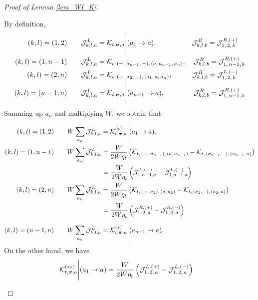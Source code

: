 \documentclass[10pt,reqno]{article}
\theoremstyle{plain} %
\theoremstyle{remark}
\numberwithin{equation}{section}
\begin{document}
\begin{proof}[Proof of Lemma \ref{lem_WI_K}]
\begin{itemize}
By definition,  
\begin{align} 
 (k,l)=(1,2) \quad &\quad   {\cal J}^L_{k,l,a}  ={\cal K}_{t, \boldsymbol{\sigma}, \textbf{a}}\Bigg|(a_1\to a) ,  
 &{\cal J}^R_{k,l,b}=  {\cal J}^{R,(+)}_{1,\,2,\,b}\quad 
 \\\nonumber
 (k,l)=(1,n-1)\quad &\quad {\cal J}^L_{k,l,a}  =
 {\cal K}_{t, \,(+,\;\sigma_{n-1},\,-),\, (a,\,a_{n-1},\,a_n)},  
 &{\cal J}^R_{k,l,b}=  {\cal J}^{R,(+)}_{1,\,{n-1},\,b}
  \\\nonumber
 (k,l)=(2,n)  \quad &\quad  {\cal J}^L_{k,l,a}  =
 {\cal K}_{t, \,(+,\;\sigma_{2},\,-),\, (a_1,\,a,\,a_n)} ,  
 &{\cal J}^R_{k,l,b}=  {\cal J}^{L,(-)}_{1,\,2,\,b}\quad 
 \\\nonumber
 (k,l)=(n-1,n)\quad &\quad {\cal J}^L_{k,l,a}  ={\cal K}_{t, \boldsymbol{\sigma}, \textbf{a}}\Bigg|(a_{n-1}\to a), 
 &{\cal J}^R_{k,l,b}=  {\cal J}^{R,(+)}_{1,\,{n-1},\,b}
\end{align}
 Summing  up $a_n$ and multiplying  $W$,  we obtain that
 \begin{align} 
 (k,l)=(1,2) \quad &\quad  W\sum_{a_n} {\cal J}^L_{k,l,a}  ={\cal K}^{(*)}_{t, \boldsymbol{\sigma}, \textbf{a}}\Bigg|(a_1\to a) ,  
   \\\nonumber
 (k,l)=(1,n-1)\quad &\quad W \sum_{a_n}{\cal J}^L_{k,l,a}  =
 \frac{W}{2W\eta_t} 
 \left({\cal K}_{t, \,(+,\;\sigma_{n-1}),\, (a,\,a_{n-1} )} 
 - {\cal K}_{t, \,( \sigma_{n-1},-),\, ( a_{n-1}, \, a )}  \right)
 \\\nonumber
 & \quad \quad \quad\quad \quad \quad\;=  \frac{W}{2W\eta_t} 
 \left({\cal J}^{L, (+)}_{1,n-1,a} 
 - {\cal J}^{L, (-)}_{1,n-1,a} \right)
   \\\nonumber
 (k,l)=(2,n)  \quad &\quad  W\sum_{a_n} {\cal J}^L_{k,l,a}  =
\frac{W}{2W\eta_t} 
 \left({\cal K}_{t, \,(+,\;\sigma_{2}),\, (a,\,a_{2} )} 
 - {\cal K}_{t, \,( \sigma_{2},-),\, ( a_{2}, \, a )}  \right)
 \\\nonumber
 & \quad \quad \quad\quad \quad \quad\;=  \frac{W}{2W\eta_t} 
 \left({\cal J}^{R, (+)}_{1,\,2,\,a} 
 - {\cal J}^{R, (-)}_{1,\,2,\,a} \right)  \\\nonumber
 (k,l)=(n-1,n)\quad &\quad  W\sum_{a_n}{\cal J}^L_{k,l,a}  ={\cal K}^{(*)}_{t, \boldsymbol{\sigma}, \textbf{a}}\Bigg|(a_{n-1}\to a), 
 \end{align}
  On the other hand, we have 
  \begin{align}
      {\cal K}^{(**)}_{t, \boldsymbol{\sigma}, \textbf{a}}\Bigg|(a_1\to a) 
      & = \frac{W}{2W\eta_t}
      \left({\cal J}^{L, (+)}_{1,\,2,\,a}-{\cal J}^{L, (-)}_{1,\,2,\,a}\right)

\end{align}
\end{itemize}
\end{proof}
\end{document}
